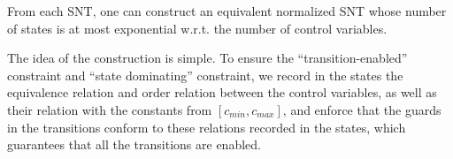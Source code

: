 {%
%
\begin{proposition}\label{prop-snt-norm}
	From each SNT, one can construct an equivalent normalized SNT whose number of states is at most exponential w.r.t. the number of control variables. 
\end{proposition}
%
The idea of the construction is simple. 
To ensure the ``transition-enabled'' constraint and ``state dominating'' constraint, we record in the states the equivalence relation and order relation between the control variables, as well as their relation with the constants from $[c_{min}, c_{max}]$, and enforce that the guards in the transitions conform to these relations recorded in the states, which guarantees that all the transitions are enabled.

}